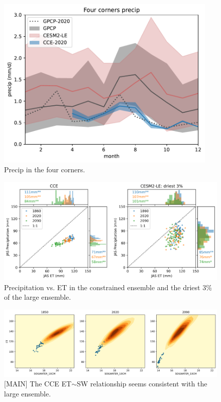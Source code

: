\documentclass[11pt]{article}
\begin{document}
\newpage

\begin{figure}[h]
\centering
\includegraphics[width=25pc]{figs/main/precip.pdf}
\caption{Precip in the four corners.}
\label{fig:precip}
\end{figure}


\newpage




\newpage
\begin{figure}[h]
\centering
\includegraphics[width=40pc]{figs/main/scatter_ET_P.png}
\caption{Precipitation vs. ET in the constrained ensemble and the driest 3\% of the large ensemble.}
\label{fig:precip}
\end{figure}








\begin{figure}[h]
\centering
\includegraphics[width=40pc]{figs/contours/SOILWATER_10CM_ET_contours.png}
\caption{[MAIN] The CCE ET$\sim$SW relationship seems consistent with the large ensemble.}
\label{fig:precip}
\end{figure}
\end{document}

